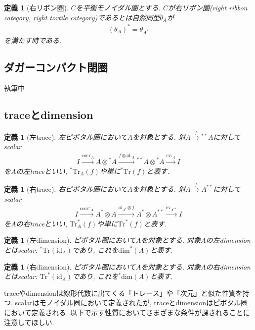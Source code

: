 \documentclass[a4paper,12pt]{ltjsarticle}
\theoremstyle{break}
\newtheorem{defn}[thm]{定義}
\newcommand{\xr}[1]{\xrightarrow{#1}}
\newcommand{\id}{\mathrm{id}}
\newcommand{\eva}{\mathrm{ev}}
\newcommand{\coev}{\mathrm{coev}}
\newcommand{\ot}{\otimes}
\newcommand{\tra}{\mathrm{Tr}}
\newcommand{\dime}{\mathrm{dim}}
\numberwithin{equation}{section}
\begin{document}
\begin{defn}[右リボン圏]
  $C$を平衡モノイダル圏とする. $C$が右リボン圏(right ribbon category, right tortile category)であるとは自然同型$\theta_A$が
  \begin{align*}
    (\theta_A)^*=\theta_{A^*}
  \end{align*}
  を満たす時である. 
\end{defn}

\subsection{ダガーコンパクト閉圏}

執筆中

\subsection{traceとdimension}

\begin{defn}[左trace]
  左ピボタル圏において$A$を対象とする. 
  射$A \xr{f} {}^{**}A$に対してscalar
  \begin{align*}
    I \xr{\coev_A} A \ot {}^*A \xr{f \ot \id_{{}^*A}} {}^{**}A \ot {}^*A \xr{\eva_{{}^*A}} I
  \end{align*}  
    を$A$の左traceといい, ${}^*\tra_A(f)$や単に${}^*\tra(f)$と表す.  
\end{defn}

\begin{defn}[右trace]
  右ピボタル圏において$A$を対象とする. 
  射$A \xr{f} A^{**}$に対してscalar
  \begin{align*}
    I \xr{\coev'_A} A^* \ot A \xr{\id_{A^*} \ot f} A^* \ot A^{**} \xr{\eva_{A^{**}}} I
  \end{align*}  
    を$A$の右traceといい, $\tra^*_A(f)$や単に$\tra^*(f)$と表す.  
\end{defn}

\begin{defn}[左dimension]%
  ピボタル圏において$A$を対象とする. 
  対象$A$の左dimensionとはscalar: ${}^*\tra(\id_A)$であり, これを$\dime^*(A)$と表す. 
\end{defn}

\begin{defn}[右dimension]%
  ピボタル圏において$A$を対象とする. 
  対象$A$の右dimensionとはscalar: $\tra^*(\id_A)$であり, これを${}^*\dime(A)$と表す. 
\end{defn}

traceやdimensionは線形代数に出てくる「トレース」や「次元」と似た性質を持つ. 
scalarはモノイダル圏において定義されたが, traceとdimensionはピボタル圏において定義される. 
以下で示す性質においてさまざまな条件が課されることに注意してほしい. 
\end{document}
